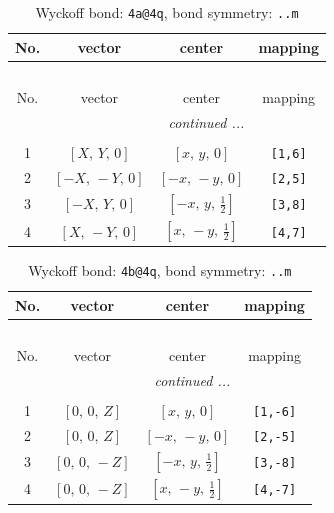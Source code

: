 \documentclass[fleqn,8pt]{jsarticle}
\begin{document}
\begin{longtable}{cccc}
\caption{Wyckoff bond: {\tt 4a@4q}, bond symmetry: {\tt ..m}}
 \\
 \hline \hline
No. & vector & center & mapping \\ \hline \endfirsthead

\multicolumn{3}{l}{\tablename\ \thetable{}} \\
 \hline \hline
No. & vector & center & mapping \\ \hline \endhead

 \hline \hline
\multicolumn{3}{r}{\footnotesize\it continued ...} \\ \endfoot

 \hline \hline
\multicolumn{3}{r}{} \\ \endlastfoot

1 & $\left[ X,\, Y,\, 0 \right]$ & $\left[ x,\, y,\, 0 \right]$ & {\tt [1,6]} \\ \hline
2 & $\left[ - X,\, - Y,\, 0 \right]$ & $\left[ - x,\, - y,\, 0 \right]$ & {\tt [2,5]} \\ \hline
3 & $\left[ - X,\, Y,\, 0 \right]$ & $\left[ - x,\, y,\, \frac{1}{2} \right]$ & {\tt [3,8]} \\ \hline
4 & $\left[ X,\, - Y,\, 0 \right]$ & $\left[ x,\, - y,\, \frac{1}{2} \right]$ & {\tt [4,7]} \\
\end{longtable}
\renewcommand{\arraystretch}{1.2}
\begin{longtable}{cccc}
\caption{Wyckoff bond: {\tt 4b@4q}, bond symmetry: {\tt ..m}}
 \\
 \hline \hline
No. & vector & center & mapping \\ \hline \endfirsthead

\multicolumn{3}{l}{\tablename\ \thetable{}} \\
 \hline \hline
No. & vector & center & mapping \\ \hline \endhead

 \hline \hline
\multicolumn{3}{r}{\footnotesize\it continued ...} \\ \endfoot

 \hline \hline
\multicolumn{3}{r}{} \\ \endlastfoot

1 & $\left[ 0,\, 0,\, Z \right]$ & $\left[ x,\, y,\, 0 \right]$ & {\tt [1,-6]} \\ \hline
2 & $\left[ 0,\, 0,\, Z \right]$ & $\left[ - x,\, - y,\, 0 \right]$ & {\tt [2,-5]} \\ \hline
3 & $\left[ 0,\, 0,\, - Z \right]$ & $\left[ - x,\, y,\, \frac{1}{2} \right]$ & {\tt [3,-8]} \\ \hline
4 & $\left[ 0,\, 0,\, - Z \right]$ & $\left[ x,\, - y,\, \frac{1}{2} \right]$ & {\tt [4,-7]} \\
\end{longtable}
\end{document}

